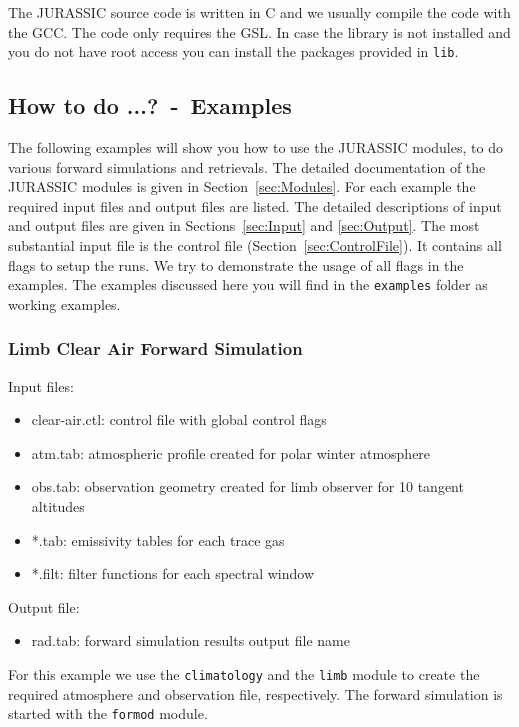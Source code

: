 The JURASSIC source code is written in C and we usually compile the code with the GCC. The code only requires the GSL. In case the library is not installed and you do not have root access you can install the packages provided in \texttt{lib}.

\subsection{How to do ...?~-~Examples}
The following examples will show you how to use the JURASSIC modules, to do various forward simulations and retrievals. The detailed documentation of the JURASSIC modules is given in Section~\ref{sec:Modules}. For each example the required input files and output files are listed. The detailed descriptions of input and output files are given in Sections~\ref{sec:Input} and \ref{sec:Output}. The most substantial input file is the control file (Section~\ref{sec:ControlFile}). It contains all flags to setup the runs. We try to demonstrate the usage of all flags in the examples. The examples discussed here you will find in the \texttt{examples} folder as working examples.

\subsubsection{Limb Clear Air Forward Simulation}
\label{sec:LimbClear}
Input files:
\begin{itemize}
\item clear-air.ctl: control file with global control flags
\item atm.tab: atmospheric profile created for polar winter atmosphere
\item obs.tab: observation geometry created for limb observer for 10 tangent altitudes
\item *.tab: emissivity tables for each trace gas
\item *.filt: filter functions for each spectral window
\end{itemize}

Output file:
\begin{itemize}
\item rad.tab: forward simulation results output file name
\end{itemize}

For this example we use the \texttt{climatology} and the  \texttt{limb} module to create the required atmosphere and observation file, respectively. The forward simulation is started with the \texttt{formod} module.

